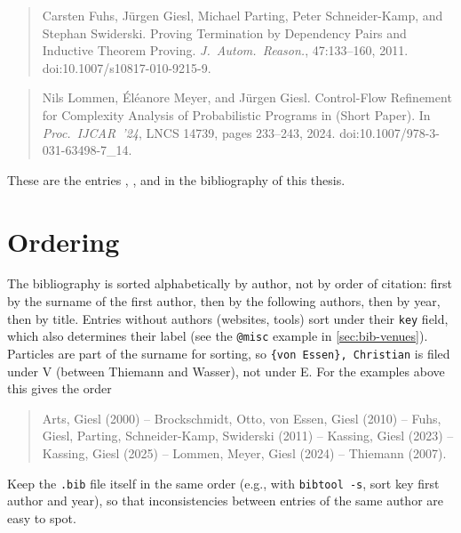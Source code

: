 \begin{quote}
    Carsten Fuhs, Jürgen Giesl, Michael Parting, Peter Schneider-Kamp, and
    Stephan Swiderski. Proving Termination by Dependency Pairs and Inductive
    Theorem Proving. \emph{J.\ Autom.\ Reason.}, 47:133--160, 2011.
    doi:10.1007/s10817-010-9215-9.
\end{quote}

\begin{quote}
    Nils Lommen, Éléanore Meyer, and Jürgen Giesl. Control-Flow Refinement for
    Complexity Analysis of Probabilistic Programs in  (Short Paper).
    In \emph{Proc.\ IJCAR~'24}, LNCS 14739, pages 233--243, 2024.
    doi:10.1007/978-3-031-63498-7\_14.
\end{quote}

These are the entries \cite{kassinggiesl2023iast},
\cite{fuhs2011provingterminationdependency}, and \cite{lommen2024KoATShortPaper}
in the bibliography of this thesis.

\section{Ordering}\label{sec:bib-ordering}

The bibliography is sorted alphabetically by author, not by order of citation:
first by the surname of the first author, then by the following authors, then
by year, then by title.
Entries without authors (websites, tools) sort under their \lstinline|key|
field, which also determines their label (see the \lstinline|@misc| example
in \cref{sec:bib-venues}).
Particles are part of the surname for sorting, so
\lstinline|{von Essen}, Christian| is filed under V (between Thiemann and
Wasser), not under E.
For the examples above this gives the order
\begin{quote}
    Arts, Giesl (2000) -- Brockschmidt, Otto, von Essen, Giesl (2010) --
    Fuhs, Giesl, Parting, Schneider-Kamp, Swiderski (2011) --
    Kassing, Giesl (2023) -- Kassing, Giesl (2025) --
    Lommen, Meyer, Giesl (2024) -- Thiemann (2007).
\end{quote}

Keep the \lstinline|.bib| file itself in the same order (e.g., with
\lstinline|bibtool -s|, sort key first author and year), so that
inconsistencies between entries of the same author are easy to spot.
